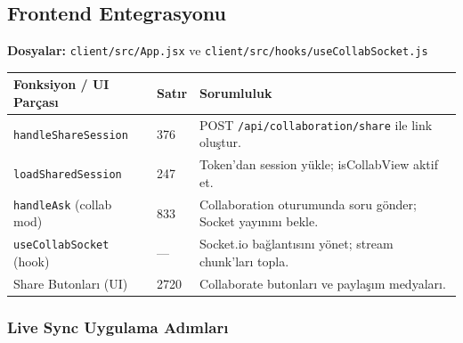 \documentclass[11pt,a4paper]{article}
\begin{document}
\subsection{Frontend Entegrasyonu}

\textbf{Dosyalar:} \texttt{client/src/App.jsx} ve \texttt{client/src/hooks/useCollabSocket.js}

\begin{tabularx}{\textwidth}{@{} L{4cm} L{1.5cm} X @{}}
\toprule
\textbf{Fonksiyon / UI Parçası} & \textbf{Satır} & \textbf{Sorumluluk} \\
\midrule
\texttt{handleShareSession} & 376 & POST \texttt{/api/collaboration/share} ile link oluştur. \\
\addlinespace
\texttt{loadSharedSession} & 247 & Token'dan session yükle; isCollabView aktif et. \\
\addlinespace
\texttt{handleAsk} (collab mod) & 833 & Collaboration oturumunda soru gönder; Socket yayınını bekle. \\
\addlinespace
\texttt{useCollabSocket} (hook) & — & Socket.io bağlantısını yönet; stream chunk'ları topla. \\
\addlinespace
Share Butonları (UI) & 2720 & Collaborate butonları ve paylaşım medyaları. \\
\bottomrule
\end{tabularx}

\subsubsection{Live Sync Uygulama Adımları}
\end{document}
